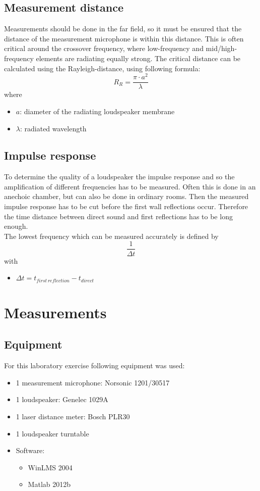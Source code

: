 \documentclass{article}
\begin{document}
\subsection{Measurement distance}
Measurements should be done in the far field, so it must be ensured that the distance of the measurement microphone is within this distance. This is often critical around the crossover frequency, where low-frequency and mid/high-frequency elements are radiating equally strong. The critical distance can be calculated using the Rayleigh-distance, using following formula:
\begin{equation}
R_R=\frac{\pi\cdot a^2}{\lambda}
\end{equation}
where
\begin{itemize}
\item $a$: diameter of the radiating loudspeaker membrane
\item $\lambda$: radiated wavelength 
\end{itemize}
\subsection{Impulse response}
To determine the quality of a loudspeaker the impulse response and so the amplification of different frequencies has to be measured. Often this is done in an anechoic chamber, but can also be done in ordinary rooms. Then the measured impulse response has to be cut before the first wall reflections occur. Therefore the time distance between direct sound and first reflections has to be long enough.\\
The lowest frequency which can be measured accurately is defined by
\begin{equation}
\frac{1}{\Delta t}
\end{equation}
with 
\begin{itemize}
\item $\Delta t = t_{first\,reflection}-t_{direct}$
\end{itemize}
\section{Measurements}
\subsection{Equipment}
For this laboratory exercise following equipment was used:
\begin{itemize}
\item 1 measurement microphone: Norsonic 1201/30517
\item 1 loudspeaker: Genelec 1029A
\item 1 laser distance meter: Bosch PLR30
\item 1 loudspeaker turntable
\item Software:
\begin{itemize}
\item WinLMS 2004
\item Matlab 2012b
\end{itemize}
\end{itemize}
\end{document}
